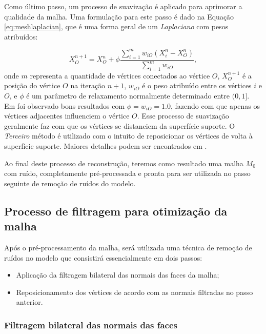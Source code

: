 Como último passo, um processo de suavização é aplicado para aprimorar a qualidade da malha. Uma formulação para este passo é dado na Equação \ref{eq:meshlaplacian}, que é uma forma geral de um \textit{Laplaciano} com pesos atribuídos:

\begin{equation} \label{eq:meshlaplacian}
    X^{n+1}_O = X^{n}_O + \phi \frac{\sum^{m}_{i=1} w_{iO}(X^{n}_i - X^{n}_O) }{\sum^{m}_{i=1} w_{iO}},
\end{equation}
onde $m$ representa a quantidade de vértices conectados ao vértice $O$, $X^{n+1}_O$ é a posição do vértice $O$ na iteração $n+1$, $w_{iO}$ é o peso atribuído entre os vértices $i$ e $O$, e $\phi$ é um parâmetro de relaxamento normalmente determinado entre $(0,1]$. Em \cite{miranda2009surface} foi observado bons resultados com $\phi = w_{iO} = 1.0$, fazendo com que apenas os vértices adjacentes influenciem o vértice $O$. Esse processo de suavização geralmente faz com que os vértices se distanciem da superfície suporte. O \textit{Terceiro} método é utilizado com o intuito de reposicionar os vértices de volta à superfície suporte. Maiores detalhes podem ser encontrados em \cite{miranda2009surface}. 

Ao final deste processo de reconstrução, teremos como resultado uma malha $M_0$ com ruído, completamente pré-processada e pronta para ser utilizada no passo seguinte de remoção de ruídos do modelo.


\subsection{Processo de filtragem para otimização da malha}

Após o pré-processamento da malha, será utilizada uma técnica de remoção de ruídos no modelo que consistirá essencialmente em dois passos:

\begin{itemize}
    \item Aplicação da filtragem bilateral das normais das faces da malha;
    \item Reposicionamento dos vértices de acordo com as normais filtradas no passo anterior.
\end{itemize}


\subsubsection{Filtragem bilateral das normais das faces}

